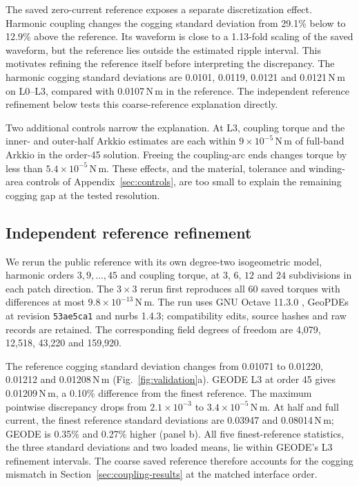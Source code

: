\documentclass{anvil-paper}
\begin{document}
The saved zero-current reference exposes a separate discretization effect. Harmonic coupling changes the
cogging standard deviation from 29.1\% below to 12.9\% above the reference.
Its waveform is close to a 1.13-fold scaling of the saved waveform, but the
reference lies outside the estimated ripple interval. This motivates
refining the reference itself before interpreting the discrepancy. The harmonic cogging standard deviations are
0.0101, 0.0119, 0.0121 and 0.0121\,N\,m on L0--L3, compared with
0.0107\,N\,m in the reference. The independent reference refinement below tests this coarse-reference
explanation directly.

Two additional controls narrow the explanation. At L3, coupling torque
and the inner- and outer-half Arkkio estimates are each within
$9\times10^{-5}$\,N\,m of full-band Arkkio in the order-45 solution.
Freeing the coupling-arc ends changes torque by less than
$5.4\times10^{-5}$\,N\,m. These effects, and the material, tolerance and
winding-area controls of Appendix~\ref{sec:controls}, are too small to
explain the remaining cogging gap at the tested resolution.

\subsection{Independent reference refinement}\label{sec:refinement}
We rerun the public reference with its own degree-two isogeometric model,
harmonic orders $3,9,\ldots,45$ and coupling torque, at $3$, $6$, $12$ and
$24$ subdivisions in each patch direction. The $3\times3$ rerun first
reproduces all 60 saved torques with differences at most $9.8\times10^{-13}$\,N\,m.
The run uses GNU Octave 11.3.0 \citep{eaton2026octave}, GeoPDEs
\citep{defalco2011geopdes,vazquez2016geopdes} at revision \texttt{53ae5ca1}
and nurbs 1.4.3; compatibility edits, source hashes and raw records are retained.
The corresponding field degrees of freedom are 4,079, 12,518, 43,220
and 159,920.

The reference cogging standard deviation changes from 0.01071 to 0.01220,
0.01212 and 0.01208\,N\,m (Fig.~\ref{fig:validation}a). GEODE L3 at order
45 gives 0.01209\,N\,m, a 0.10\% difference from the finest reference.
The maximum pointwise discrepancy drops from $2.1\times10^{-3}$ to
$3.4\times10^{-5}$\,N\,m. At half and full current, the finest reference
standard deviations are 0.03947 and 0.08014\,N\,m;
GEODE is 0.35\% and 0.27\% higher (panel b). All five finest-reference
statistics, the three
standard deviations and two loaded means, lie within GEODE's L3
refinement intervals. The coarse saved reference therefore accounts for
the cogging mismatch in Section~\ref{sec:coupling-results} at the matched interface order.
\end{document}
